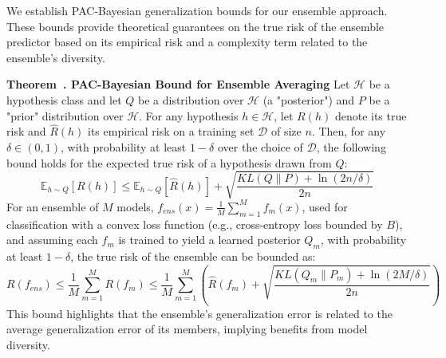 \documentclass[journal]{IEEEtran}
\newcounter{theorem}
\newenvironment{theorem}[1][]{\refstepcounter{theorem}\par\medskip
   \noindent \textbf{Theorem~\thetheorem. #1} \rmfamily}{\medskip}
\begin{document}
We establish PAC-Bayesian generalization bounds for our ensemble approach. These bounds provide theoretical guarantees on the true risk of the ensemble predictor based on its empirical risk and a complexity term related to the ensemble's diversity.

\begin{theorem}[PAC-Bayesian Bound for Ensemble Averaging]
\label{thm:pac_bayes}
Let $\mathcal{H}$ be a hypothesis class and let $Q$ be a distribution over $\mathcal{H}$ (a "posterior") and $P$ be a "prior" distribution over $\mathcal{H}$. For any hypothesis $h \in \mathcal{H}$, let $R(h)$ denote its true risk and $\hat{R}(h)$ its empirical risk on a training set $\mathcal{D}$ of size $n$. Then, for any $\delta \in (0,1)$, with probability at least $1-\delta$ over the choice of $\mathcal{D}$, the following bound holds for the expected true risk of a hypothesis drawn from $Q$:
\begin{equation}
\mathbb{E}_{h \sim Q}[R(h)] \leq \mathbb{E}_{h \sim Q}[\hat{R}(h)] + \sqrt{\frac{KL(Q \| P) + \ln(2n/\delta)}{2n}}
\end{equation}
For an ensemble of $M$ models, $f_{ens}(x) = \frac{1}{M} \sum_{m=1}^M f_m(x)$, used for classification with a convex loss function (e.g., cross-entropy loss bounded by $B$), and assuming each $f_m$ is trained to yield a learned posterior $Q_m$, with probability at least $1-\delta$, the true risk of the ensemble can be bounded as:
\begin{equation}
R(f_{ens}) \leq \frac{1}{M} \sum_{m=1}^M R(f_m) \leq \frac{1}{M} \sum_{m=1}^M \left( \hat{R}(f_m) + \sqrt{\frac{KL(Q_m \| P_m) + \ln(2M/\delta)}{2n}} \right)
\end{equation}
This bound highlights that the ensemble's generalization error is related to the average generalization error of its members, implying benefits from model diversity.
\end{theorem}
\end{document}

